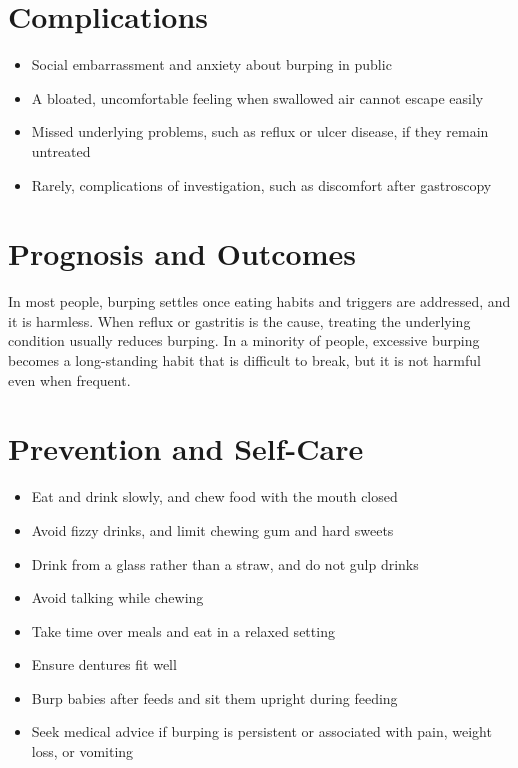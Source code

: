 \section*{Complications}
\begin{itemize}
    \item Social embarrassment and anxiety about burping in public
    \item A bloated, uncomfortable feeling when swallowed air cannot escape easily
    \item Missed underlying problems, such as reflux or ulcer disease, if they remain untreated
    \item Rarely, complications of investigation, such as discomfort after gastroscopy
\end{itemize}

\section*{Prognosis and Outcomes}
In most people, burping settles once eating habits and triggers are addressed, and it is harmless. When reflux or gastritis is the cause, treating the underlying condition usually reduces burping. In a minority of people, excessive burping becomes a long-standing habit that is difficult to break, but it is not harmful even when frequent.

\section*{Prevention and Self-Care}
\begin{itemize}
    \item Eat and drink slowly, and chew food with the mouth closed
    \item Avoid fizzy drinks, and limit chewing gum and hard sweets
    \item Drink from a glass rather than a straw, and do not gulp drinks
    \item Avoid talking while chewing
    \item Take time over meals and eat in a relaxed setting
    \item Ensure dentures fit well
    \item Burp babies after feeds and sit them upright during feeding
    \item Seek medical advice if burping is persistent or associated with pain, weight loss, or vomiting
\end{itemize}

